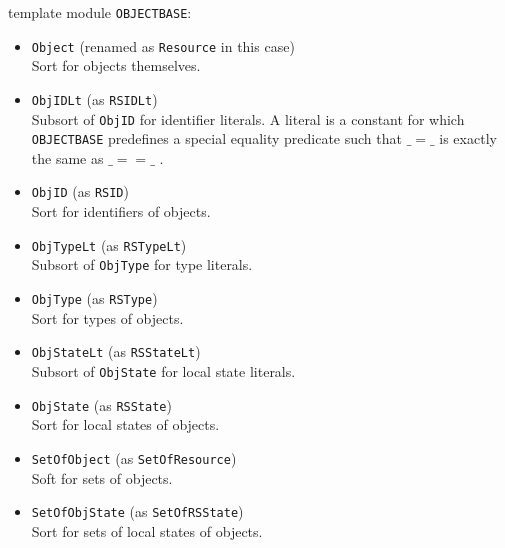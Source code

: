 \documentclass[12pt]{report}
\newcommand{\stt}[1]{{\small{\tt {#1}}}}
\begin{document}
template module {\tt OBJECTBASE}:
\begin{itemize}
\item \stt{Object} (renamed as \stt{Resource} in this case)\\
  Sort for objects themselves.
\item \stt{ObjIDLt} (as \stt{RSIDLt})\\
  Subsort of {\tt ObjID} for identifier literals. A literal is a
  constant for which {\tt OBJECTBASE} predefines a special equality
  predicate such that $\_ = \_$ is exactly the same as $\_ == \_ $ .
\item \stt{ObjID} (as \stt{RSID})\\
  Sort for identifiers of objects.
\item \stt{ObjTypeLt} (as \stt{RSTypeLt})\\
  Subsort of {\tt ObjType} for type literals.
\item \stt{ObjType} (as \stt{RSType})\\
  Sort for types of objects.
\item \stt{ObjStateLt} (as \stt{RSStateLt})\\
  Subsort of {\tt ObjState} for local state literals.
\item \stt{ObjState} (as \stt{RSState})\\
  Sort for local states of objects.
\item \stt{SetOfObject} (as \stt{SetOfResource})\\
  Soft for sets of objects.
\item \stt{SetOfObjState} (as \stt{SetOfRSState})\\
  Sort for sets of local states of objects.
\end{itemize}
\end{document}
